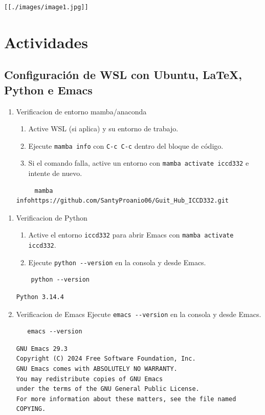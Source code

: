 \documentclass{article}
\begin{document}
\begin{verbatim}
[[./images/image1.jpg]]
\end{verbatim}
\section{Actividades}
\label{sec:org35cf5d1}
\subsection{Configuración de WSL con Ubuntu, \LaTeX, Python e Emacs}
\label{sec:orgba5e6d4}

\begin{enumerate}
\item Verificacion de entorno mamba/anaconda
\begin{enumerate}
\item Active WSL (si aplica) y su entorno de trabajo.
\item Ejecute \texttt{mamba info} con \texttt{C-c C-c} dentro del bloque de código.
\item Si el comando falla, active un entorno con \texttt{mamba activate iccd332} e intente de nuevo.
\end{enumerate}

\begin{verbatim}
     mamba infohttps://github.com/SantyProanio06/Guit_Hub_ICCD332.git
\end{verbatim}
\end{enumerate}


\begin{enumerate}
\item Verificacion de Python
\begin{enumerate}
\item Active el entorno \texttt{iccd332} para abrir Emacs con \texttt{mamba activate iccd332}.
\item Ejecute \texttt{python -{}-{}version} en la consola y desde Emacs.
\end{enumerate}

\begin{verbatim}
    python --version
\end{verbatim}

\begin{verbatim}
Python 3.14.4
\end{verbatim}

\item Verificacion de Emacs
Ejecute \texttt{emacs -{}-{}version} en la consola y desde Emacs.

\begin{verbatim}
   emacs --version
\end{verbatim}

\begin{verbatim}
GNU Emacs 29.3
Copyright (C) 2024 Free Software Foundation, Inc.
GNU Emacs comes with ABSOLUTELY NO WARRANTY.
You may redistribute copies of GNU Emacs
under the terms of the GNU General Public License.
For more information about these matters, see the file named COPYING.
\end{verbatim}
\end{enumerate}
\end{document}
